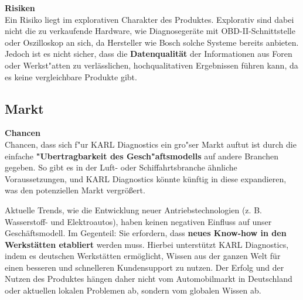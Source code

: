 \textbf{Risiken} \\
Ein Risiko liegt im explorativen Charakter des Produktes. Explorativ sind dabei nicht die zu verkaufende Hardware, wie Diagnoseger\"ate mit \ac{OBD}-II-Schnittstelle oder Oszilloskop an sich, da Hersteller wie Bosch solche Systeme bereits anbieten. Jedoch ist es nicht sicher, dass die \textbf{Datenqualit\"at} der Informationen aus Foren oder Werkst"atten zu verl\"asslichen, hochqualitativen Ergebnissen f\"uhren kann, da es keine vergleichbare Produkte gibt. \\


\subsection{Markt}
\textbf{Chancen} \\
Chancen, dass sich f"ur KARL Diagnostics ein gro"ser Markt auftut ist durch die einfache \textbf{"Ubertragbarkeit des Gesch"aftsmodells} auf andere Branchen gegeben. So gibt es in der Luft- oder Schiffahrtsbranche \"ahnliche Voraussetzungen, und KARL Diagnostics k\"onnte k\"unftig in diese expandieren, was den potenziellen Markt vergr\"o\ss ert. 

Aktuelle Trends, wie die Entwicklung neuer Antriebstechnologien (z. B. Wasserstoff- und Elektroautos), haben keinen negativen Einfluss auf unser Gesch\"aftsmodell. Im Gegenteil: Sie erfordern, dass \textbf{neues Know-how in den Werkst\"atten etabliert} werden muss. Hierbei unterst\"utzt KARL Diagnostics, indem es deutschen Werkst\"atten erm\"oglicht, Wissen aus der ganzen Welt f\"ur einen besseren und schnelleren Kundensupport zu nutzen. Der Erfolg und der Nutzen des Produktes h\"angen daher nicht vom Automobilmarkt in Deutschland oder aktuellen lokalen Problemen ab, sondern vom globalen Wissen ab. 

